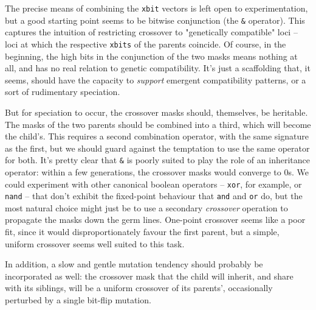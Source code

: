 \documentclass[11pt]{article}
\begin{document}
The precise means of combining the \texttt{xbit} vectors is left open to
experimentation, but a good starting point seems to be bitwise conjunction (the
\texttt{\&} operator). This captures the intuition of restricting crossover to
"genetically compatible" loci -- loci at which the respective \texttt{xbits} of the
parents coincide. Of course, in the beginning, the high bits in the conjunction
of the two masks means nothing at all, and has no real relation to genetic
compatibility. It's just a scaffolding that, it seems, should have the capacity
to \emph{support} emergent compatibility patterns, or a sort of rudimentary
speciation.

But for speciation to occur, the crossover masks should, themselves, be
heritable. The masks of the two parents should be combined into a third,
which will become the child's. This requires a second combination operator,
with the same signature as the first, but we should guard against the
temptation to use the same operator for both. It's pretty clear that \texttt{\&}
is poorly suited to play the role of an inheritance operator: within a
few generations, the crossover masks would converge to 0s. We could
experiment with other canonical boolean operators -- \texttt{xor}, for example,
or \texttt{nand} -- that don't exhibit the fixed-point behaviour that \texttt{and} and
\texttt{or} do, but the most natural choice might just be to use a secondary
\emph{crossover} operation to propagate the masks down the germ lines.
One-point crossover seems like a poor fit, since it would disproportionately
favour the first parent, but a simple, uniform crossover seems well
suited to this task.

In addition, a slow and gentle mutation tendency should probably be 
incorporated as well: the crossover mask that the child will inherit,
and share with its siblings, will be a uniform crossover of its
parents', occasionally perturbed by a single bit-flip mutation.
\end{document}
